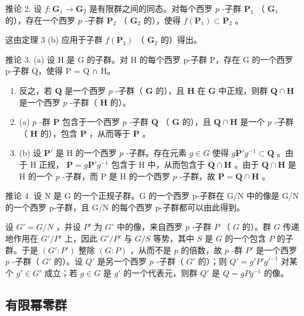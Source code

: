 推论 2. 设 \(f: \mathbf{G}_{1} \to \mathbf{G}_{2}\) 是有限群之间的同态。对每个西罗 \(p\) -子群 \(\mathbf{P}_{1}\) （ \(\mathbf{G}_{1}\) 的），存在一个西罗 \(p\) -子群 \(\mathbf{P}_{2}\) （ \(\mathbf{G}_{2}\) 的），使得 \(f(\mathbf{P}_{1}) \subset \mathbf{P}_{2}\) 。

这由定理 3 (b) 应用于子群 \(f(\mathbf{P}_1)\) （ \(\mathbf{G}_2\) 的）得出。

推论 3. (a) 设 H 是 G 的子群。对 H 的每个西罗 p-子群 P，存在 G 的一个西罗 p-子群 Q，使得 P = Q ∩ H。

\begin{enumerate}
\def\labelenumi{(\alph{enumi})}
\setcounter{enumi}{1}
\item
  反之，若 \(\mathbf{Q}\) 是一个西罗 \(p\) -子群（ \(\mathbf{G}\) 的），且 \(\mathbf{H}\) 在 \(\mathbf{G}\) 中正规，则群 \(\mathbf{Q} \cap \mathbf{H}\) 是一个西罗 \(p\) -子群（ \(\mathbf{H}\) 的）。
\item
  (a) \(p\) -群 \(\mathbf{P}\) 包含于一个西罗 \(p\) -子群 \(\mathbf{Q}\) （ \(\mathbf{G}\) 的），且 \(\mathbf{Q} \cap \mathbf{H}\) 是一个 \(p\) -子群（ \(\mathbf{H}\) 的），包含 \(\mathbf{P}\) ，从而等于 \(\mathbf{P}\) 。
\item
  (b) 设 \(\mathbf{P}'\) 是 H 的一个西罗 \(p\) -子群。存在元素 \(g \in G\) 使得 \(g\mathbf{P}'g^{-1} \subset \mathbf{Q}\) 。由于 H 正规， \(\mathbf{P} = g\mathbf{P}'g^{-1}\) 包含于 H 中，从而包含于 \(\mathbf{Q} \cap \mathbf{H}\) 。由于 \(\mathbf{Q} \cap \mathbf{H}\) 是 H 的一个 \(p\) -子群，而 P 是 H 的一个西罗 \(p\) -子群，故 \(\mathbf{P} = \mathbf{Q} \cap \mathbf{H}\) 。
\end{enumerate}

推论 4. 设 N 是 G 的一个正规子群。G 的一个西罗 p-子群在 G/N 中的像是 G/N 的一个西罗 p-子群，且 G/N 的每个西罗 p-子群都可以由此得到。

设 \(G' = G/N\) ，并设 \(P'\) 为 \(G'\) 中的像，来自西罗 \(p\) -子群 \(P\) （ \(G\) 的）。群 \(G\) 传递地作用在 \(G'/P'\) 上，因此 \(G'/P'\) 与 \(G/S\) 等势，其中 \(S\) 是 \(G\) 的一个包含 \(P\) 的子群。于是 \((G':P')\) 整除 \((G:P)\) ，从而不是 \(p\) 的倍数，故 \(p\) -群 \(P'\) 是一个西罗 \(p\) -子群（ \(G'\) 的）。设 \(Q'\) 是另一个西罗 \(p\) -子群（ \(G'\) 的）；则 \(Q' = g'P'g'^{-1}\) 对某个 \(g' \in G'\) 成立；若 \(g \in G\) 是 \(g'\) 的一个代表元，则群 \(Q'\) 是 \(Q = gPg^{-1}\) 的像。

\subsection{有限幂零群}

